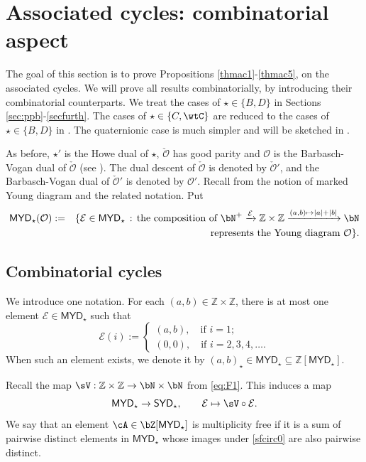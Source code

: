 \documentclass[11pt,a4paper]{amsart}
\def\SYD{{\mathsf{SYD}}}
\def\MYD{{\mathsf{MYD}}}
\def\abs#1{\left|{#1}\right|}
\newcommand{\CE}{{\mathcal {E}}}
\newcommand{\CO}{{\mathcal {O}}}
\newcommand{\Z}{\mathbb{Z}}
\def\DD{\nabla}
\newcommand{\be}{\begin {equation}}
\newcommand{\ee}{\end {equation}}
\numberwithin{equation}{section}
\theoremstyle{remark}
\def\subset{\subseteq}
\def\SYD{{\mathsf{SYD}}}
\def\MYD{{\mathsf{MYD}}}
\begin{document}
\section{Associated cycles: combinatorial aspect}
\label{sec:ACC}

\def\dsign{{}^d\mathrm{Sign}}

\def\acm{\cL}
\def\acme{\tilde{\cL}}
\def\dlifttso{{\check \vartheta}_{\sfss_{\tau'},\cO'}^{\sfss_{\tau},\;\cO}}
\def\DDtss{\DD_{\sfss_{\tau'}}^{\sfss_{\tau}}}
\def\taut{\tau_{\bftt}}

The goal of this section is to prove Propositions \ref{thmac1}-\ref{thmac5}, on the associated cycles. We will prove all results combinatorially, by introducing their combinatorial counterparts.
We treat the cases of $\star\in \{B,D\}$ in Sections \ref{sec:ppb}-\ref{secfurth}. The cases of  $\star\in \{C,\wtC\}$ are reduced to the cases of  $\star\in \{B,D\}$ in . The quaternionic case is much simpler and will be sketched in .

As before, $\star'$ is the Howe dual of $\star$, $\check \CO$ has good parity and  $\CO$ is the Barbasch-Vogan dual of $\check \CO$ (see ). The dual descent of $\check \CO$ is denoted by $\check \CO'$, and the Barbasch-Vogan dual of $\check \CO'$ is denoted by $\CO'$.  Recall from  the notion of marked Young diagram and the related notation. Put
\begin{eqnarray*}
\MYD_\star(\CO)&:=&\{\CE\in \MYD_\star\,:\, \textrm{the composition of $\bN^+\xrightarrow{\CE} \Z\times \Z\xrightarrow{(a,b)\mapsto \abs{a}+\abs{b}}\bN$}\\
&&\qquad \qquad \qquad \textrm{represents the Young diagram $\CO$}\}.
\end{eqnarray*}


\subsection{Combinatorial cycles}
We introduce one notation. For each $(a,b)\in \Z\times \Z$, there is at most one element $\CE\in \MYD_\star$ such that
\[
  \CE(i):=\begin{cases}
    (a,b),\quad\textrm{if $i=1$;}
    \\
    (0,0),\quad\textrm{if $i=2,3,4, \dots$.}
  \end{cases}
\] When such an element exists, we denote it by $(a,b)_\star\in \MYD_\star\subset\Z[\MYD_\star]$.


Recall the map $\sV: \Z\times \Z  \rightarrow \bN\times \bN$ from \eqref{eq:F1}. This induces a map
\be\label{sfcirc0}
 \MYD_\star\rightarrow \SYD_\star,\qquad \CE\mapsto \sV \circ \CE.
 \ee
 We say that an element $\cA \in \bZ[\MYD_\star]$ is multiplicity free if it is a sum of
pairwise distinct elements in $\MYD_\star$ whose images under \eqref{sfcirc0} are also pairwise distinct.
\end{document}
